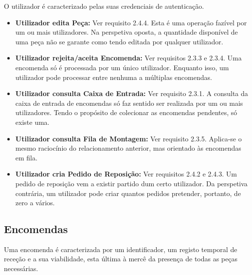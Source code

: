             O utilizador é caracterizado pelas suas credenciais de autenticação.

            \begin{itemize}
        
                \item \textbf{Utilizador edita Peça:} Ver requisito 2.4.4. Esta é uma operação fazível por um ou mais utilizadores. Na perspetiva oposta, a quantidade disponível de uma peça não se garante como tendo editada por qualquer utilizador.
        
                \item \textbf{Utilizador rejeita/aceita Encomenda:} Ver requisitos 2.3.3 e 2.3.4. Uma encomenda só é processada por um único utilizador. Enquanto isso, um utilizador pode processar entre nenhuma a múltiplas encomendas.
        
                \item \textbf{Utilizador consulta Caixa de Entrada:} Ver requisito 2.3.1. A consulta da caixa de entrada de encomendas só faz sentido ser realizada por um ou mais utilizadores. Tendo o propósito de colecionar as encomendas pendentes, só existe uma.
        
                \item \textbf{Utilizador consulta Fila de Montagem:} Ver requisito 2.3.5. Aplica-se o mesmo raciocínio do relacionamento anterior, mas orientado às encomendas em fila.
        
                \item \textbf{Utilizador cria Pedido de Reposição:} Ver requisitos 2.4.2 e 2.4.3. Um pedido de reposição vem a existir partido dum certo utilizador. Da perspetiva contrária, um utilizador pode criar quantos pedidos pretender, portanto, de zero a vários.

            \end{itemize}

        \newpage
        \subsection{Encomendas}

            Uma encomenda é caracterizada por um identificador, um registo temporal de receção e a sua viabilidade, esta última à mercê da presença de todas as peças necessárias. 

